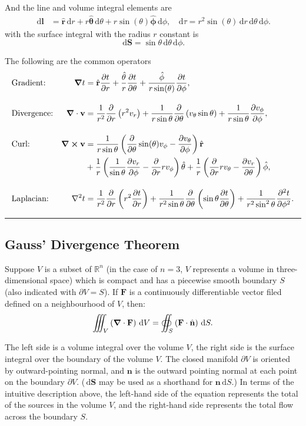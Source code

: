 \documentclass[12pt,english]{article}
\newcommand{\dmr}[1]{\, \mathrm{d}#1} %
\numberwithin{equation}{subsection}
\let\oldhat\hat
\renewcommand{\vec}[1]{\mathbf{#1}}
\renewcommand{\hat}[1]{\oldhat{\mathbf{#1}}}
\begin{document}
And the line and volume integral elements are
\begin{align*}
    \dmr{\vec{l}} &= \hat{r}\dmr{r} + r\hat{\theta}\dmr{\theta} + r  \sin(\theta) \hat{\phi} \dmr{\phi}, & \dmr{\tau} = r^2 \sin(\theta) \dmr{r} \dmr{\theta} \dmr{\phi}.
\end{align*}
with the surface integral with the radius $r$ constant is
\[
    \dmr{\vec{S}} = \sin\theta \dmr{\theta} \dmr{\phi}.
\]

The following are the common operators
\begin{align*}
    &\text{Gradient:} &\grad t  &= \hat{r}\pdv{t}{r} + \frac{\hat{\theta}}{r}\pdv{t}{\theta} + \frac{\hat{\phi}}{r \sin(\theta)}\pdv{t}{\phi},\\[1em]
    &\text{Divergence:} &\grad\cdot\vec{v} &= \frac{1}{r^{2}} \frac{\partial}{\partial r}\left(r^{2} v_r \right)+\frac{1}{r \sin \theta} \frac{\partial}{\partial \theta}\left(v_{\theta} \sin \theta\right)+\frac{1}{r \sin \theta} \frac{\partial v_{\phi}}{\partial \phi},\\[1em]
    &\text{Curl:} &\grad \cross \vec{v} &= \frac{1}{r\sin\theta}\left(\pdv{}{\theta}\sin(\theta) v_\phi- \pdv{v_\theta}{\phi}\right)\hat{r}\\
    &&&+\frac{1}{r}\left(\frac{1}{\sin\theta}\pdv{v_r}{\phi}-\pdv{}{r}  r v_\phi  \right)\hat{\theta}+ \frac{1}{r}\left(\pdv{}{r}rv_\theta-\pdv{v_r}{\theta}\right)\hat{\phi},\\[1em]
    &\text{Laplacian:} &\laplacian t &= \frac{1}{r^2}\pdv{}{r}\left(r^2\pdv{t}{r}\right)+ \frac{1}{r^2\sin\theta}\pdv{}{\theta}\left(\sin\theta\pdv{t}{\theta}\right) +\frac{1}{r^2 \sin^2 \theta}\pdv[2]{t}{\phi}.
\end{align*}

\par\noindent\rule{\textwidth}{0.4pt}

\subsection{Gauss' Divergence Theorem}
Suppose $V$ is a subset of $\mathbb{R}^n$ (in the case of $n=3$, $V$ represents a volume in three-dimensional space) which is compact and has a piecewise smooth boundary $S$ (also indicated with $\partial V = S$). If $\vec{F}$ is a continuously differentiable vector filed defined on a neighbourhood of $V$, then:
\[
    \iiint_{V} \left(\grad \cdot \vec{F}\right)\dmr{V} = \oiint_{S} \left(\vec{F}\cdot\hat{n}\right)\dmr{S}.
\]
\par The left side is a volume integral over the volume $V$, the right side is the surface integral over the boundary of the volume $V$. The closed manifold $\partial V$ is oriented by outward-pointing normal, and $\vec{n}$ is the outward pointing normal at each point on the boundary $\partial V$. ($\dmr{\vec{S}}$ may be used as a shorthand for $\vec{n}\dmr{S}$.) In terms of the intuitive description above, the left-hand side of the equation represents the total of the sources in the volume $V$, and the right-hand side represents the total flow across the boundary $S$.\cite{noauthor_divergence_2021}
\end{document}
